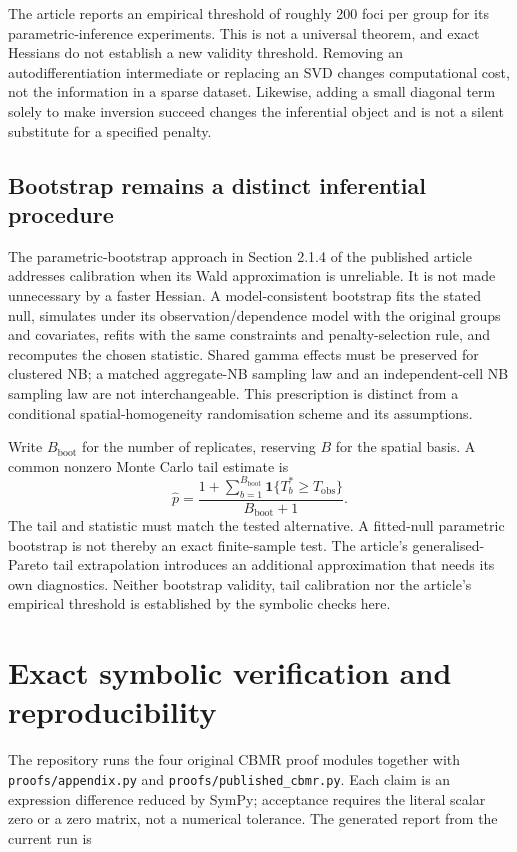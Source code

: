 \documentclass[11pt,a4paper]{article}
\numberwithin{equation}{section}
\begin{document}
The article reports an empirical threshold of roughly 200 foci per group
for its parametric-inference experiments. This is not a universal theorem,
and exact Hessians do not establish a new validity threshold. Removing an
autodifferentiation intermediate or replacing an SVD changes computational
cost, not the information in a sparse dataset. Likewise, adding a small
diagonal term solely to make inversion succeed changes the inferential
object and is not a silent substitute for a specified penalty.

\subsection{Bootstrap remains a distinct inferential procedure}
The parametric-bootstrap approach in Section 2.1.4 of the published article
addresses calibration when its Wald approximation is unreliable. It is not
made unnecessary by a faster Hessian. A model-consistent bootstrap fits
the stated null, simulates under its observation/dependence model with the
original groups and covariates, refits with the same constraints and
penalty-selection rule, and recomputes the chosen statistic.
Shared gamma effects must be preserved for clustered NB; a matched
aggregate-NB sampling law and an independent-cell NB sampling law are not
interchangeable. This prescription is distinct from a conditional
spatial-homogeneity randomisation scheme and its assumptions.

Write $B_{\mathrm{boot}}$ for the number of replicates, reserving $B$ for the
spatial basis. A common nonzero Monte Carlo tail estimate is
\[
 \widehat p=\frac{1+\sum_{b=1}^{B_{\mathrm{boot}}}
       \mathbf1\{T_b^*\geq T_{\mathrm{obs}}\}}{B_{\mathrm{boot}}+1}.
\]
The tail and statistic must match the tested alternative. A fitted-null
parametric bootstrap is not thereby an exact finite-sample test.
The article's generalised-Pareto tail extrapolation introduces an additional
approximation that needs its own diagnostics. Neither bootstrap validity,
tail calibration nor the article's empirical threshold is established by
the symbolic checks here.

\section{Exact symbolic verification and reproducibility}\label{sec:verification}

The repository runs the four original CBMR proof modules together with
\texttt{proofs/appendix.py} and \texttt{proofs/published\_cbmr.py}.
Each claim is an expression difference reduced
by SymPy; acceptance requires the literal scalar zero or a zero matrix,
not a numerical tolerance. The generated report from the current run is
\begin{center}

\end{center}
\end{document}
